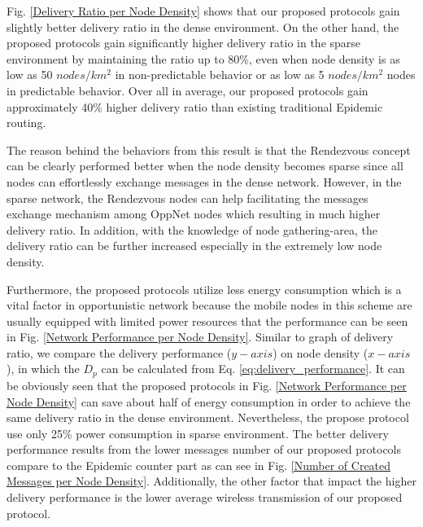 Fig. \ref{Delivery Ratio per Node Density} shows that our proposed protocols gain slightly better delivery ratio in the dense environment.
On the other hand, the proposed protocols gain significantly higher delivery ratio in the sparse environment by maintaining the ratio up to 80\%, even when node density is as low as 50 $nodes/km^2$ in non-predictable behavior or as low as 5 $nodes/km^2$ nodes in predictable behavior.
Over all in average, our proposed protocols gain approximately 40\% higher delivery ratio than existing traditional Epidemic routing.

The reason behind the behaviors from this result is that the Rendezvous concept can be clearly performed better when the node density becomes sparse since all nodes can effortlessly exchange messages in the dense network.
However, in the sparse network, the Rendezvous nodes can help facilitating the messages exchange mechanism among OppNet nodes which resulting in much higher delivery ratio.
In addition, with the knowledge of node gathering-area, the delivery ratio can be further increased especially in the extremely low node density.

Furthermore, the proposed protocols utilize less energy consumption which is a vital factor in opportunistic network because the mobile nodes in this scheme are usually equipped with limited power resources that the performance can be seen in Fig. \ref{Network Performance per Node Density}.
Similar to graph of delivery ratio, we compare the delivery performance ($y-axis$) on node density ($x-axis$), in which the $D_p$ can be calculated from Eq. \ref{eq:delivery_performance}.
It can be obviously seen that the proposed protocols in Fig. \ref{Network Performance per Node Density} can save about half of energy consumption in order to achieve the same delivery ratio in the dense environment.
Nevertheless, the propose protocol use only 25\% power consumption in sparse environment.
The better delivery performance results from the lower messages number of our proposed protocols compare to the Epidemic counter part as can see in Fig. \ref{Number of Created Messages per Node Density}.
Additionally, the other factor that impact the higher delivery performance is the lower average wireless transmission of our proposed protocol.


